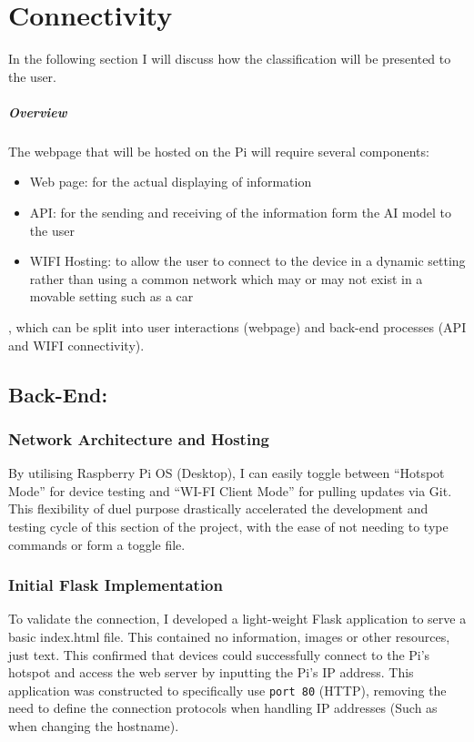 \chapter*{Connectivity}

In the following section I will discuss how the classification will be presented to the user.

\paragraph{Overview}
The webpage that will be hosted on the Pi will require several components:
\begin{itemize}
    \item Web page: for the actual displaying of information
    \item API: for the sending and receiving of the information form the AI model to the user
    \item WIFI Hosting: to allow the user to connect to the device in a dynamic setting rather than using a common network which may or
    may not exist in a movable setting such as a car
\end{itemize}
, which can be split into user interactions (webpage) and back-end processes (API and WIFI connectivity).

\section{Back-End:}
\subsection{Network Architecture and Hosting}
By utilising Raspberry Pi OS (Desktop), I can easily toggle between “Hotspot Mode” for device testing and “WI-FI Client Mode” for pulling
updates via Git. This flexibility of duel purpose drastically accelerated the development and testing cycle of this section of the project,
with the ease of not needing to type commands or form a toggle file.
\subsection{Initial Flask Implementation}
To validate the connection, I developed a light-weight Flask application to serve a basic index.html file. This contained no information,
images or other resources, just text. This confirmed that devices could successfully connect to the Pi’s hotspot and access the web
server by inputting the Pi’s IP address.
This application was constructed to specifically use \texttt{port 80} (HTTP), removing the need to define the connection protocols when handling
IP addresses (Such as when changing the hostname).
